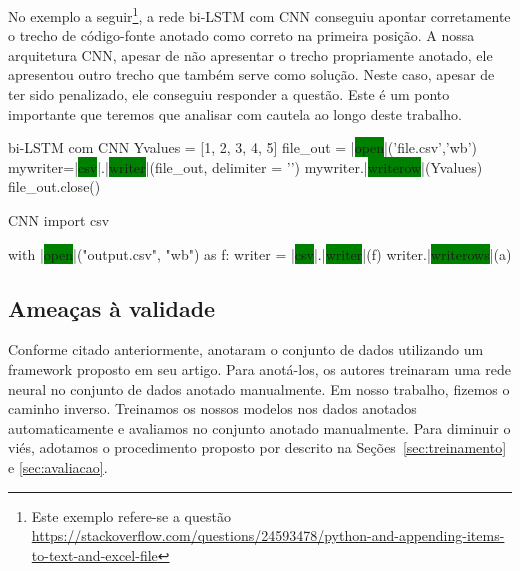 No exemplo a seguir\footnote{Este exemplo refere-se a questão \url{https://stackoverflow.com/questions/24593478/python-and-appending-items-to-text-and-excel-file}\label{foot:exemplo-resultados-preliminares}}, a rede bi-LSTM com CNN conseguiu apontar corretamente o trecho de código-fonte anotado como correto na primeira posição.
A nossa arquitetura CNN, apesar de não apresentar o trecho propriamente anotado, ele apresentou outro trecho que também serve como solução. Neste caso, apesar de ter sido penalizado, ele conseguiu responder a questão. Este é um ponto importante que teremos que analisar com cautela ao longo deste trabalho. 

\begin{tcolorbox}[colframe=orange!75!black,colback=gray!15!white,fonttitle=\bfseries,adjusted title=\large{Python and appending items to text and \colorbox{green}{excel} \colorbox{green}{file}}~\ref{foot:exemplo-resultados-preliminares},
enlarge top by=1cm%
]
\begin{mypython-without-margin}{bi-LSTM com CNN}
Yvalues = [1, 2, 3, 4, 5]
file_out = |\colorbox{green}{open}|('file.csv','wb')
mywriter=|\colorbox{green}{csv}|.|\colorbox{green}{writer}|(file_out, delimiter = '\n')
mywriter.|\colorbox{green}{writerow}|(Yvalues)
file_out.close()
\end{mypython-without-margin}

\begin{mypython-without-margin}{CNN}
import csv

with |\colorbox{green}{open}|("output.csv", "wb") as f:
    writer = |\colorbox{green}{csv}|.|\colorbox{green}{writer}|(f)
    writer.|\colorbox{green}{writerows}|(a)
\end{mypython-without-margin}

\end{tcolorbox}

\subsection{Ameaças à validade}

Conforme citado anteriormente, \cite{yao-2018} anotaram o conjunto de dados utilizando um framework proposto em seu artigo. Para anotá-los, os autores treinaram uma rede neural no conjunto de dados anotado manualmente. Em nosso trabalho, fizemos o caminho inverso. Treinamos os nossos modelos nos dados anotados automaticamente e avaliamos no conjunto anotado manualmente. Para diminuir o viés, adotamos o procedimento proposto por \cite{iyer-etal-2016-summarizing} descrito na Seções~\ref{sec:treinamento} e \ref{sec:avaliacao}.

